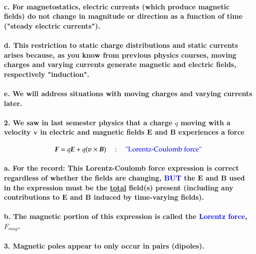 \documentclass{article}
\begin{document}
\paragraph{\indent c. For magnetostatics, electric currents (which produce magnetic fields) do not change in magnitude or direction as a function of time ("steady electric currents").}
\paragraph{\indent d. This restriction to static charge distributions and static currents arises because, as you know from previous physics courses, moving charges and varying currents generate magnetic and electric fields, respectively "induction".}
\paragraph{\indent e. We will address situations with moving charges and varying currents later.}
\paragraph{2. We saw in last semester physics that a charge $q$ moving with a velocity $\boldsymbol{v}$ in electric and magnetic fields $\boldsymbol{E}$ and $\boldsymbol{B}$ experiences a force}
\begin{equation*}
    \boldsymbol{F}=q\boldsymbol{E}+q(\boldsymbol{v}\times \boldsymbol{B})\quad:\quad \text{\textcolor{blue}{"Lorentz-Coulomb force"}}
\end{equation*}
\paragraph{\indent a. For the record: This Lorentz-Coulomb force expression is correct regardless of whether the fields are changing, \textcolor{blue}{BUT} the $\boldsymbol{E}$ and $\boldsymbol{B}$ used in the expression must be the \underline{total} field(s) present (including any contributions to $\boldsymbol{E}$ and $\boldsymbol{B}$ induced by time-varying fields).}
\paragraph{\indent b. The magnetic portion of this expression is called the \textcolor{blue}{Lorentz force}, $F_{mag}$.}
\paragraph{3. Magnetic poles appear to only occur in pairs (dipoles).}
\end{document}

